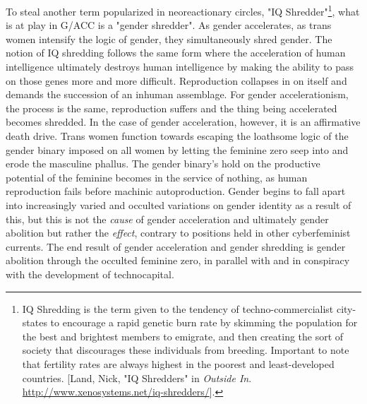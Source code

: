 \documentclass[10pt, statementpaper, twoside, openright]{memoir}
\begin{document}
To steal another term popularized in neoreactionary circles, "IQ Shredder"\footnote{IQ Shredding is the term given to the tendency of techno-commercialist city-states to encourage a rapid genetic burn rate by skimming the population for the best and brightest members to emigrate, and then creating the sort of society that discourages these individuals from breeding. Important to note that fertility rates are always highest in the poorest and least-developed countries. [Land, Nick, "IQ Shredders" in \textit{Outside In}. \href{http://www.xenosystems.net/iq-shredders/}{http://www.xenosystems.net/iq-shredders/}].}, what is at play in G/ACC is a "gender shredder". As gender accelerates, as trans women intensify the logic of gender, they simultaneously shred gender. The notion of IQ shredding follows the same form where the acceleration of human intelligence ultimately destroys human intelligence by making the ability to pass on those genes more and more difficult. Reproduction collapses in on itself and demands the succession of an inhuman assemblage. For gender accelerationism, the process is the same, reproduction suffers and the thing being accelerated becomes shredded. In the case of gender acceleration, however, it is an affirmative death drive. Trans women function towards escaping the loathsome logic of the gender binary imposed on all women by letting the feminine zero seep into and erode the masculine phallus. The gender binary's hold on the productive potential of the feminine becomes in the service of nothing, as human reproduction fails before machinic autoproduction. Gender begins to fall apart into increasingly varied and occulted variations on gender identity as a result of this, but this is not the \emph{cause} of gender acceleration and ultimately gender abolition but rather the \emph{effect}, contrary to positions held in other cyberfeminist currents. The end result of gender acceleration and gender shredding is gender abolition through the occulted feminine zero, in parallel with and in conspiracy with the development of technocapital.
\end{document}
